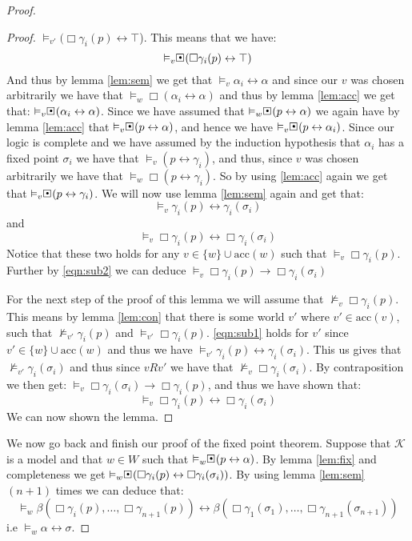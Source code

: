 \documentclass[../main.tex]{subfiles}
\begin{document}
\begin{proof}
\begin{proof}
		$\vDash_{v'}(\Box\gamma_i(p)\leftrightarrow\top$). This means
		that we have:
		\[\vDash_v\sBox(\Box\gamma_i(p)\leftrightarrow\top)\]
		And thus by lemma \ref{lem:sem} we get that
		$\vDash_v\alpha_i\leftrightarrow\alpha$ and since our $v$ was
		chosen arbitrarily we have that
		$\vDash_w\Box(\alpha_i\leftrightarrow\alpha)$ and thus by
		lemma \ref{lem:acc} we get that:
		$\vDash_v\sBox(\alpha_i\leftrightarrow\alpha)$. Since we have
		assumed that $\vDash_w\sBox(p\leftrightarrow\alpha)$ we again
		have by lemma \ref{lem:acc} that
		$\vDash_v\sBox(p\leftrightarrow\alpha)$, and hence we have
		$\vDash_v\sBox(p\leftrightarrow\alpha_i)$. Since our logic is
		complete and we have assumed by the induction hypothesis that
		$\alpha_i$ has a fixed point $\sigma_i$ we have that
		$\vDash_v(p\leftrightarrow\gamma_i)$, and thus, since $v$ was
		chosen arbitrarily we have that
		$\vDash_w\Box(p\leftrightarrow\gamma_i)$. So by using
		\ref{lem:acc} again we get that
		$\vDash_v\sBox(p\leftrightarrow\gamma_i)$. We will now use
		lemma \ref{lem:sem} again and get that:
		\begin{equation}
			\label{eqn:sub1}
			\vDash_v\gamma_i(p)\leftrightarrow\gamma_i(\sigma_i)
		\end{equation}
		and
		\begin{equation}
			\label{eqn:sub2}
			\vDash_v\Box\gamma_i(p)\leftrightarrow\Box\gamma_i(\sigma_i)
		\end{equation}
		Notice that these two holds for any $v\in\{w\}\cup\text{acc}(w)$ such that
		$\vDash_v\Box\gamma_i(p)$.
		Further by \ref{eqn:sub2} we can deduce
		$\vDash_v\Box\gamma_i(p)\rightarrow\Box\gamma_i(\sigma_i)$

		For the next step of the proof of this lemma we will assume that
		$\not\vDash_v\Box\gamma_i(p)$. This means by lemma
		\ref{lem:con} that there is some world $v'$ where
		$v'\in\text{acc}(v)$, such that $\not\vDash_{v'}\gamma_i(p)$
		and $\vDash_{v'}\Box\gamma_i(p)$. \ref{eqn:sub1} holds for $v'$
		since $v'\in\{w\}\cup\text{acc}(w)$ and thus we have
		$\vDash_{v'}\gamma_i(p)\leftrightarrow\gamma_i(\sigma_i)$. This
		us
		gives that $\not\vDash_{v'}\gamma_i(\sigma_i)$ and thus since
		$vRv'$ we have that $\not\vDash_v\Box\gamma_i(\sigma_i)$. By
		contraposition we then get:
		$\vDash_v\Box\gamma_i(\sigma_i)\rightarrow\Box\gamma_i(p)$, and
		thus we have shown that:
		$$\vDash_v\Box\gamma_i(p)\leftrightarrow\Box\gamma_i(\sigma_i)$$
		We can now shown the lemma.
	\end{proof}
	We now go back and finish our proof of the fixed point theorem. Suppose
	that $\mathcal{K}$ is a model and that $w\in W$ such that
	$\vDash_w\sBox(p\leftrightarrow\alpha)$. By lemma \ref{lem:fix} and
	completeness we get
	$\vDash_w\sBox(\Box\gamma_i(p)\leftrightarrow\Box\gamma_i(\sigma_i))$.
	By using lemma \ref{lem:sem} $(n+1)$ times we can deduce that:
	$$\vDash_w\beta(\Box\gamma_i(p),\ldots,\Box\gamma_{n+1}(p))\leftrightarrow\beta(
	\Box\gamma_1(\sigma_1),\ldots,\Box\gamma_{n+1}(\sigma_{n+1}))$$
	i.e $\vDash_w\alpha\leftrightarrow\sigma$. 


\end{proof}
\end{document}
